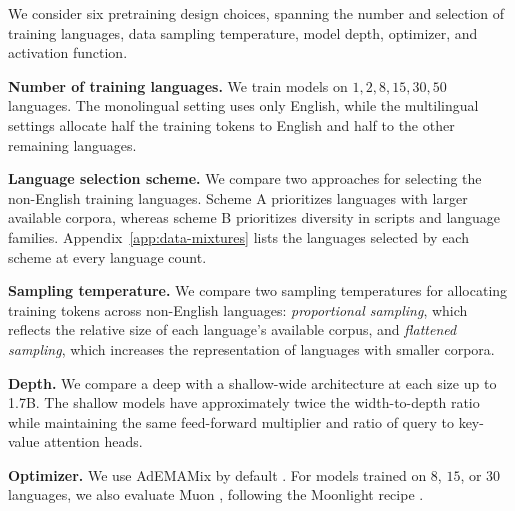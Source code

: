 We consider six pretraining design choices, spanning the number and selection of training languages, data sampling temperature, model depth, optimizer, and activation function.

\textbf{Number of training languages.} We train models on $1, 2, 8, 15, 30, 50$ languages. The monolingual setting uses only English, while the multilingual settings allocate half the training tokens to English and half to the other remaining languages.

\textbf{Language selection scheme.}
We compare two approaches for selecting the non-English training languages. Scheme A prioritizes languages with larger available corpora, whereas scheme B prioritizes diversity in scripts and language families.
Appendix~\ref{app:data-mixtures} lists the languages selected by each scheme at every language count.

\textbf{Sampling temperature.}
We compare two sampling temperatures for allocating training tokens across non-English languages: \textit{proportional sampling}, which reflects the relative size of each language's available corpus, and \textit{flattened sampling}, which increases the representation of languages with smaller corpora.

\textbf{Depth.} We compare a deep with a shallow-wide architecture at each size up to 1.7B. The shallow models have approximately twice the width-to-depth ratio while maintaining the same feed-forward multiplier and ratio of query to key-value attention heads. 

\textbf{Optimizer.}
We use AdEMAMix by default \citep{pagliardini_ademamix_2024}. For models trained on $8$, $15$, or $30$ languages, we also evaluate Muon \citep{jordan_muon_2024}, following the Moonlight recipe \citep{liu_muon_2025}. 

